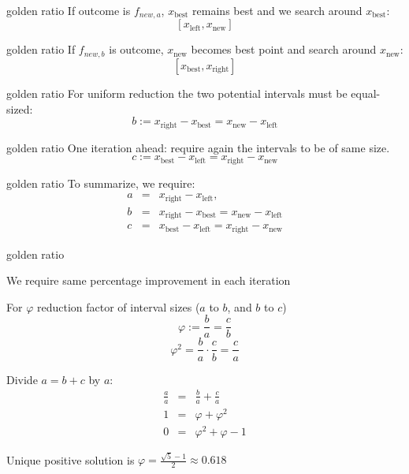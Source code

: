 \documentclass[11pt,compress,t,notes=noshow, xcolor=table]{beamer}
\newcommand{\xleft}{x_{\text{left}}}
\newcommand{\xright}{x_{\text{right}}}
\newcommand{\xnew}{x_{\text{new}}}
\newcommand{\xbest}{x_{\text{best}}}
\begin{document}
\begin{frame2}{golden ratio}
If outcome is $f_{new, a}$, $\xbest$ remains best and we search around $\xbest$: $$[\xleft, \xnew]$$
\vfill
{}
\end{frame2}

\begin{frame2}{golden ratio}
If $f_{new, b}$ is outcome, $\xnew$ becomes best point and search around $\xnew$: $$[\xbest, \xright]$$
\vfill
{}
\end{frame2}

\begin{frame2}{golden ratio}
For uniform reduction the two potential intervals must be equal-sized: 
\begin{equation*}
b := \xright - \xbest = \xnew - \xleft
\end{equation*}
\vfill
{}
\end{frame2}

\begin{frame2}{golden ratio}
One iteration ahead: require again the intervals to be of same size. 
$$c := \xbest - \xleft = \xright - \xnew$$
\vfill
{}
\end{frame2}

\begin{frame2}{golden ratio}
To summarize, we require: 
\begin{eqnarray*}
a &=& \xright-\xleft, \\
b &=& \xright - \xbest = \xnew - \xleft \\
c &=& \xbest - \xleft = \xright - \xnew
\end{eqnarray*}
\vfill
{}
\end{frame2}

\begin{framei}{golden ratio}
\item We require same percentage improvement in each iteration
\item For $\varphi$ reduction factor of interval sizes ($a$ to $b$, and $b$ to $c$)
$$\varphi := \frac{b}{a} = \frac{c}{b}$$
$$\varphi^2 = \frac{b}{a} \cdot \frac{c}{b} = \frac{c}{a}$$
\item Divide $a = b + c$ by $a$:
\begin{eqnarray*}
\frac{a}{a} &=& \frac{b}{a} + \frac{c}{a} \\
1 &=& \varphi + \varphi^2 \\
0 &=& \varphi^2 + \varphi - 1
\end{eqnarray*}
\item Unique positive solution is $\varphi = \frac{\sqrt{5}-1}{2} \approx 0.618$
\end{framei}
\end{document}
